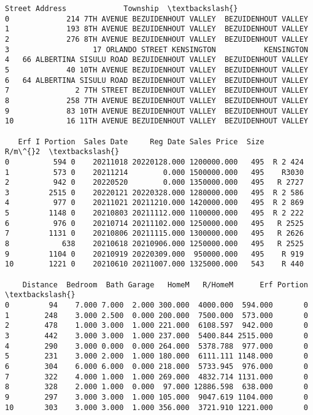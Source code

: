             \begin{tcolorbox}[breakable, size=fbox, boxrule=.5pt, pad at break*=1mm, opacityfill=0]
\begin{Verbatim}[commandchars=\\\{\}]
                                  Street Address             Township  \textbackslash{}
0             214 7TH AVENUE BEZUIDENHOUT VALLEY  BEZUIDENHOUT VALLEY
1             193 8TH AVENUE BEZUIDENHOUT VALLEY  BEZUIDENHOUT VALLEY
2             276 8TH AVENUE BEZUIDENHOUT VALLEY  BEZUIDENHOUT VALLEY
3                   17 ORLANDO STREET KENSINGTON           KENSINGTON
4   66 ALBERTINA SISULU ROAD BEZUIDENHOUT VALLEY  BEZUIDENHOUT VALLEY
5             40 10TH AVENUE BEZUIDENHOUT VALLEY  BEZUIDENHOUT VALLEY
6   64 ALBERTINA SISULU ROAD BEZUIDENHOUT VALLEY  BEZUIDENHOUT VALLEY
7               2 7TH STREET BEZUIDENHOUT VALLEY  BEZUIDENHOUT VALLEY
8             258 7TH AVENUE BEZUIDENHOUT VALLEY  BEZUIDENHOUT VALLEY
9             83 10TH AVENUE BEZUIDENHOUT VALLEY  BEZUIDENHOUT VALLEY
10            16 11TH AVENUE BEZUIDENHOUT VALLEY  BEZUIDENHOUT VALLEY

   Erf I Portion  Sales Date     Reg Date Sales Price  Size    R/m\^{}2  \textbackslash{}
0          594 0    20211018 20220128.000 1200000.000   495  R 2 424
1          573 0    20211214        0.000 1500000.000   495    R3030
2          942 0    20220520        0.000 1350000.000   495   R 2727
3         2515 0    20220121 20220328.000 1280000.000   495  R 2 586
4          977 0    20211021 20211210.000 1420000.000   495  R 2 869
5         1148 0    20210803 20211112.000 1100000.000   495  R 2 222
6          976 0    20210714 20211102.000 1250000.000   495   R 2525
7         1131 0    20210806 20211115.000 1300000.000   495   R 2626
8            638    20210618 20210906.000 1250000.000   495   R 2525
9         1104 0    20210919 20220309.000  950000.000   495    R 919
10        1221 0    20210610 20211007.000 1325000.000   543    R 440

    Distance  Bedroom  Bath Garage   HomeM   R/HomeM      Erf Portion  \textbackslash{}
0         94    7.000 7.000  2.000 300.000  4000.000  594.000       0
1        248    3.000 2.500  0.000 200.000  7500.000  573.000       0
2        478    1.000 3.000  1.000 221.000  6108.597  942.000       0
3        442    3.000 3.000  1.000 237.000  5400.844 2515.000       0
4        290    3.000 0.000  0.000 264.000  5378.788  977.000       0
5        231    3.000 2.000  1.000 180.000  6111.111 1148.000       0
6        304    6.000 6.000  0.000 218.000  5733.945  976.000       0
7        322    4.000 1.000  1.000 269.000  4832.714 1131.000       0
8        328    2.000 1.000  0.000  97.000 12886.598  638.000       0
9        297    3.000 3.000  1.000 105.000  9047.619 1104.000       0
10       303    3.000 3.000  1.000 356.000  3721.910 1221.000       0


\end{Verbatim}
\end{tcolorbox}
